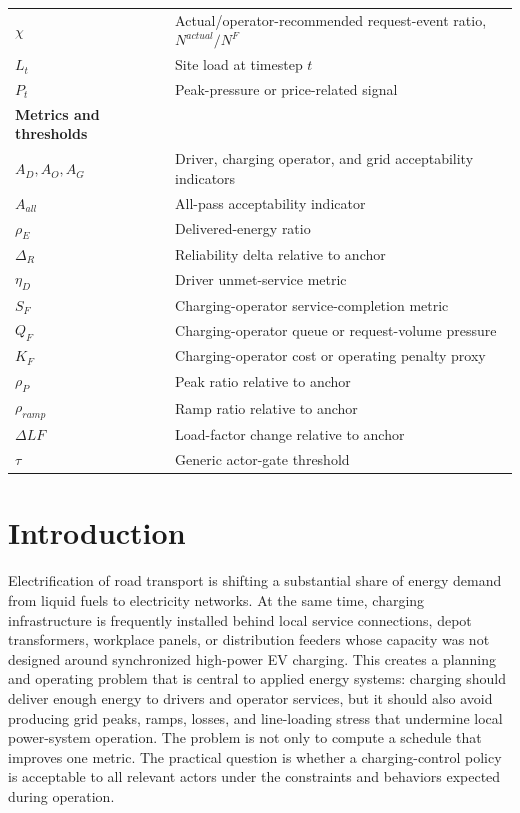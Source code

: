 \documentclass[12pt]{article}
\begin{document}
\begin{longtable}{p{}p{}}
$\chi$ & Actual/operator-recommended request-event ratio, $N^{actual}/N^F$ \\
$L_t$ & Site load at timestep $t$ \\
$P_t$ & Peak-pressure or price-related signal \\
\textbf{Metrics and thresholds} & \\
$A_D,A_O,A_G$ & Driver, charging operator, and grid acceptability indicators \\
$A_{all}$ & All-pass acceptability indicator \\
$\rho_E$ & Delivered-energy ratio \\
$\Delta_R$ & Reliability delta relative to anchor \\
$\eta_D$ & Driver unmet-service metric \\
$S_F$ & Charging-operator service-completion metric \\
$Q_F$ & Charging-operator queue or request-volume pressure \\
$K_F$ & Charging-operator cost or operating penalty proxy \\
$\rho_P$ & Peak ratio relative to anchor \\
$\rho_{ramp}$ & Ramp ratio relative to anchor \\
$\Delta LF$ & Load-factor change relative to anchor \\
$\tau$ & Generic actor-gate threshold \\
\end{longtable}

\section{Introduction}

Electrification of road transport is shifting a substantial share of energy demand from liquid fuels to electricity networks. At the same time, charging infrastructure is frequently installed behind local service connections, depot transformers, workplace panels, or distribution feeders whose capacity was not designed around synchronized high-power EV charging. This creates a planning and operating problem that is central to applied energy systems: charging should deliver enough energy to drivers and operator services, but it should also avoid producing grid peaks, ramps, losses, and line-loading stress that undermine local power-system operation. The problem is not only to compute a schedule that improves one metric. The practical question is whether a charging-control policy is acceptable to all relevant actors under the constraints and behaviors expected during operation.
\end{document}
